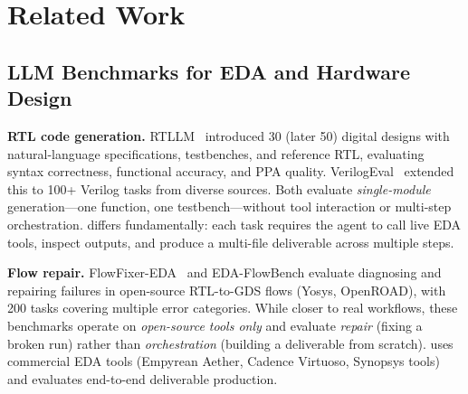 \section{Related Work}
\label{sec:related}

\subsection{LLM Benchmarks for EDA and Hardware Design}

\textbf{RTL code generation.} RTLLM~\cite{lu2024rtllm} introduced 30 (later 50) digital designs with natural-language specifications, testbenches, and reference RTL, evaluating syntax correctness, functional accuracy, and PPA quality. VerilogEval~\cite{liu2023verilogeval} extended this to 100+ Verilog tasks from diverse sources. Both evaluate \emph{single-module} generation---one function, one testbench---without tool interaction or multi-step orchestration. \bench{} differs fundamentally: each task requires the agent to call live EDA tools, inspect outputs, and produce a multi-file deliverable across multiple steps.

\textbf{Flow repair.} FlowFixer-EDA~\cite{dong2026flowfixer} and EDA-FlowBench evaluate diagnosing and repairing failures in open-source RTL-to-GDS flows (Yosys, OpenROAD), with 200 tasks covering multiple error categories. While closer to real workflows, these benchmarks operate on \emph{open-source tools only} and evaluate \emph{repair} (fixing a broken run) rather than \emph{orchestration} (building a deliverable from scratch). \bench{} uses commercial EDA tools (Empyrean Aether, Cadence Virtuoso, Synopsys tools) and evaluates end-to-end deliverable production.

